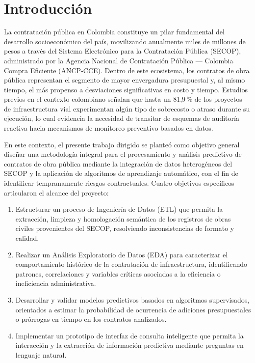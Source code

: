 \documentclass[12pt,letterpaper,oneside]{report}
\begin{document}
\tableofcontents
\listoftables
\listoffigures

\cleardoublepage
{}

\chapter{Introducción}

La contratación pública en Colombia constituye un pilar fundamental del
desarrollo socioeconómico del país, movilizando anualmente miles de millones de
pesos a través del Sistema Electrónico para la Contratación Pública (SECOP),
administrado por la Agencia Nacional de Contratación Pública --- Colombia
Compra Eficiente (ANCP-CCE). Dentro de este ecosistema, los contratos de obra
pública representan el segmento de mayor envergadura presupuestal y, al mismo
tiempo, el más propenso a desviaciones significativas en costo y tiempo.
Estudios previos en el contexto colombiano señalan que hasta un 81,9\,\% de los
proyectos de infraestructura vial experimentan algún tipo de sobrecosto o
atraso durante su ejecución, lo cual evidencia la necesidad de transitar de
esquemas de auditoría reactiva hacia mecanismos de monitoreo preventivo basados
en datos.

En este contexto, el presente trabajo dirigido se planteó como objetivo
general diseñar una metodología integral para el procesamiento y análisis
predictivo de contratos de obra pública mediante la integración de datos
heterogéneos del SECOP y la aplicación de algoritmos de aprendizaje automático,
con el fin de identificar tempranamente riesgos contractuales. Cuatro objetivos
específicos articularon el alcance del proyecto:

\begin{enumerate}
    \item Estructurar un proceso de Ingeniería de Datos (ETL) que permita la
    extracción, limpieza y homologación semántica de los registros de obras
    civiles provenientes del SECOP, resolviendo inconsistencias de formato y
    calidad.
    \item Realizar un Análisis Exploratorio de Datos (EDA) para caracterizar el
    comportamiento histórico de la contratación de infraestructura,
    identificando patrones, correlaciones y variables críticas asociadas a la
    eficiencia o ineficiencia administrativa.
    \item Desarrollar y validar modelos predictivos basados en algoritmos
    supervisados, orientados a estimar la probabilidad de ocurrencia de
    adiciones presupuestales o prórrogas en tiempo en los contratos analizados.
    \item Implementar un prototipo de interfaz de consulta inteligente que
    permita la interacción y la extracción de información predictiva mediante
    preguntas en lenguaje natural.
\end{enumerate}
\end{document}
